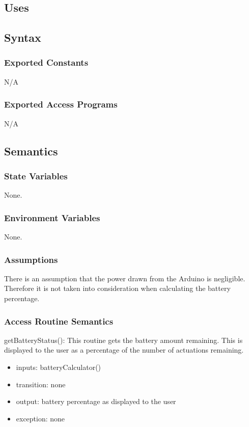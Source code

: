 \documentclass[12pt, titlepage]{article}
\begin{document}
\subsection{Uses}


\subsection{Syntax}

\subsubsection{Exported Constants}

N/A

\subsubsection{Exported Access Programs}

N/A

\subsection{Semantics}

\subsubsection{State Variables}

None.


\subsubsection{Environment Variables}

None.


\subsubsection{Assumptions}

There is an assumption that the power drawn from the Arduino is negligible. Therefore it is not taken into consideration when calculating the battery percentage. 

\subsubsection{Access Routine Semantics}

\noindent getBatteryStatus():
This routine gets the battery amount remaining. This is displayed to the user as a percentage of the number of actuations remaining. 
\begin{itemize}
\item inputs: batteryCalculator()
\item transition: none
\item output: battery percentage as displayed to the user
\item exception: none
\end{itemize}
\end{document}
